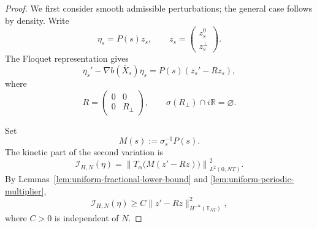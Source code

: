 \documentclass[preprint,12pt]{elsarticle}
\theoremstyle{definition}
\theoremstyle{plain}
\begin{document}
\begin{proof}
We first consider smooth admissible perturbations; the general case
follows by density. Write
\begin{equation*}
    \eta_s=P(s)z_s,
    \qquad
    z_s=
    \begin{pmatrix}
        z_s^0\\
        z_s^\perp
    \end{pmatrix}.
\end{equation*}
The Floquet representation gives
\begin{equation}
\label{eq:floquet-linearized-H-lesshalf}
    \eta_s'
    -
    \nabla b(\bar X_s)\eta_s
    =
    P(s)(z_s'-Rz_s),
\end{equation}
where
\begin{equation*}
    R=
    \begin{pmatrix}
        0&0\\
        0&R_\perp
    \end{pmatrix},
    \qquad
    \sigma(R_\perp)\cap i\mathbb R=\varnothing.
\end{equation*}

Set
\begin{equation*}
    M(s):=\sigma_s^{-1}P(s).
\end{equation*}
The kinetic part of the second variation is
\begin{equation*}
    \mathcal I_{H,N}(\eta)
    =
    \left\|
        T_\alpha
        \bigl(
            M(z'-Rz)
        \bigr)
    \right\|_{L^2(0,NT)}^2.
\end{equation*}
By Lemmas~\ref{lem:uniform-fractional-lower-bound} and
\ref{lem:uniform-periodic-multiplier},
\begin{equation}
\label{eq:kinetic-negative-Sobolev-H-lesshalf}
    \mathcal I_{H,N}(\eta)
    \geq
    C
    \|z'-Rz\|_{H^{-\alpha}(\mathbb T_{NT})}^2,
\end{equation}
where $C>0$ is independent of $N$.


\end{proof}
\end{document}
